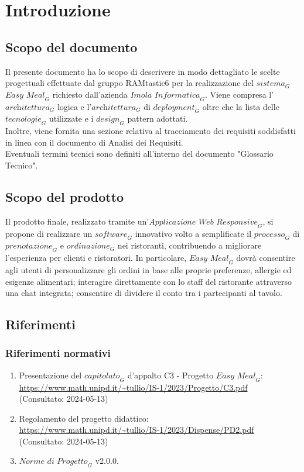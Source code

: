\section{Introduzione}
\subsection{Scopo del documento}
Il presente documento ha lo scopo di descrivere in modo dettagliato le scelte progettuali effettuate dal gruppo RAMtastic6 per la realizzazione del $\textit{sistema}_G$ $\textit{Easy Meal}_G$ richiesto dall'azienda $\textit{Imola Informatica}_G$. Viene compresa l'$\textit{architettura}_G$ logica e l'$\textit{architettura}_G$ di $\textit{deployment}_G$ oltre che la lista delle $\textit{tecnologie}_G$ utilizzate e i $\textit{design}_G$ pattern adottati. \\
Inoltre, viene fornita una sezione relativa al tracciamento dei requisiti soddisfatti in linea con il documento di Analisi dei Requisiti. \\
Eventuali termini tecnici sono definiti all'interno del documento "Glossario Tecnico".

\subsection{Scopo del prodotto}
Il prodotto finale, realizzato tramite un'$\textit{Applicazione Web Responsive}_G$, si propone di realizzare un $\textit{software}_G$ innovativo volto a semplificate il $\textit{processo}_G$ di $\textit{prenotazione}_G$ e $\textit{ordinazione}_G$ nei ristoranti, contribuendo a migliorare l'esperienza per clienti e ristoratori. In particolare, $\textit{Easy Meal}_G$ dovrà consentire agli utenti di personalizzare gli ordini in base alle proprie preferenze, allergie ed esigenze alimentari; interagire direttamente con lo staff del ristorante attraverso una chat integrata; consentire di dividere il conto tra i partecipanti al tavolo.
\subsection{Riferimenti}
\subsubsection{Riferimenti normativi}
\begin{enumerate}
    \item Presentazione del $\textit{capitolato}_G$ d'appalto C3 - Progetto $\textit{Easy Meal}_G$: \\ \url{https://www.math.unipd.it/~tullio/IS-1/2023/Progetto/C3.pdf}\\
    (Consultato: 2024-05-13)
    \item Regolamento del progetto didattico: \\ \url{https://www.math.unipd.it/~tullio/IS-1/2023/Dispense/PD2.pdf}\\
    (Consultato: 2024-05-13)
    \item $\textit{Norme di Progetto}_G$ v2.0.0.
\end{enumerate}
